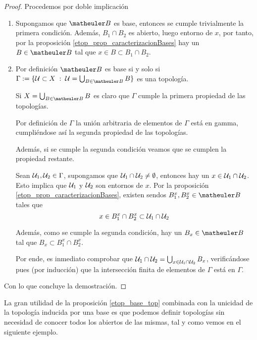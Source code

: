 \begin{proof}Procedemos por doble implicación
	\begin{enumerate}
		\item[\bra] Supongamos que $\B$ es base, entonces se cumple trivialmente la primera condición. Además, $B_1 \cap B_2$ es abierto, luego entorno de $x$, por tanto, por la proposición \ref{etop_prop_caracterizacionBases} hay un $B\in\B$ tal que $x \in B \subset B_1 \cap B_2$.
		
		\item[\bla] Por definición $\B$ es base si y solo si $\Gamma:=\{ \U \subset X \midc \U = \bigcup_{B \in \B}B\}$ es una topología.
		
		Si $X = \bigcup_{B \in \B}B$ es claro que $\Gamma$ cumple la primera propiedad de las topologías.
		
		Por definición de $\Gamma$ la unión arbitraria de elementos de $\Gamma$ está en gamma, cumpliéndose así la segunda propiedad de las topologías.
		
		Además, si se cumple la segunda condición veamos que se cumplen la propiedad restante.
		
		Sean $\mathcal{U}_1, \mathcal{U}_2 \in \Gamma$, supongamos que $\mathcal{U}_1 \cap \mathcal{U}_2 \not= \emptyset$, entonces hay un $x \in \mathcal{U}_1 \cap \mathcal{U}_2$. Esto implica que $\mathcal{U}_1$ y $\mathcal{U}_2$ son entornos de $x$. Por la proposición \ref{etop_prop_caracterizacionBases}, existen sendos $B_1^x, B_2^x\in\B$ tales que \[x \in B_1^x \cap B_2^x \subset \mathcal{U}_1 \cap \mathcal{U}_2\]
		
		Además, como se cumple la segunda condición, hay un $B_x\in\B$ tal que $B_x\subset B_1^x\cap B_2^x$.
		
		Por ende, es inmediato comprobar que $\mathcal{U}_1\cap\mathcal{U}_2=\bigcup_{x\in\mathcal{U}_1\cap\mathcal{U}_2}B_x$, verificándose pues (por inducción) que la intersección finita de elementos de $\Gamma$ está en $\Gamma$.
	\end{enumerate}
	Con lo que concluye la demostración.
\end{proof}
La gran utilidad de la proposición \ref{etop_base_top} combinada con la unicidad de la topología inducida por una base es que podemos definir topologías sin necesidad de conocer todos los abiertos de las mismas, tal y como vemos en el siguiente ejemplo.
